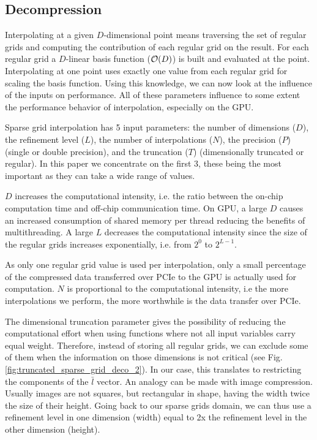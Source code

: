 \subsection{Decompression}

Interpolating at a given $D$-dimensional point means traversing the set of
regular grids and computing the contribution of each regular grid on the result. For
each regular grid a $D$-linear basis function ($\Otime{D}$) is built and
evaluated at the point. Interpolating at one point uses exactly one value from each
regular grid for scaling the basis function. Using this knowledge, we can now
look at the influence of the inputs on performance. All of these parameters
influence to some extent the performance behavior of interpolation, especially
on the GPU.

Sparse grid interpolation has 5 input parameters: the number of dimensions
($D$), the refinement level ($L$), the number of interpolations ($N$), the
precision ($P$) (single or double precision), and the truncation ($T$)
(dimensionally truncated or regular). In this paper we concentrate on the first
3, these being the most important as they can take a wide range of values.

$D$ increases the computational intensity, i.e. the ratio between the on-chip
computation time and off-chip communication time. On GPU, a large $D$ causes an
increased consumption of shared memory per thread reducing the benefits of
multithreading. A large $L$ decreases the computational intensity since the size
of the regular grids increases exponentially, i.e. from $2^0$ to $2^{L-1}$. 

As only one regular grid value is used per interpolation, only a small
percentage of the compressed data transferred over PCIe to the GPU is actually
used for computation. $N$ is proportional to the computational intensity, i.e
the more interpolations we perform, the more worthwhile is the data transfer over
PCIe.

The dimensional truncation parameter gives the possibility of reducing the
computational effort when using functions where not all input variables carry
equal weight. Therefore, instead of storing all regular grids, we can exclude
some of them when the information on those dimensions is not critical (see Fig.
\ref{fig:truncated_sparse_grid_deco_2}). In our case, this translates to
restricting the components of the $\bar{l}$ vector. An analogy can be made with
image compression. Usually images are not squares, but rectangular in shape,
having the width twice the size of their height. Going back to our sparse grids
domain, we can thus use a refinement level in one dimension (width) equal to 2x
the refinement level in the other dimension (height).

